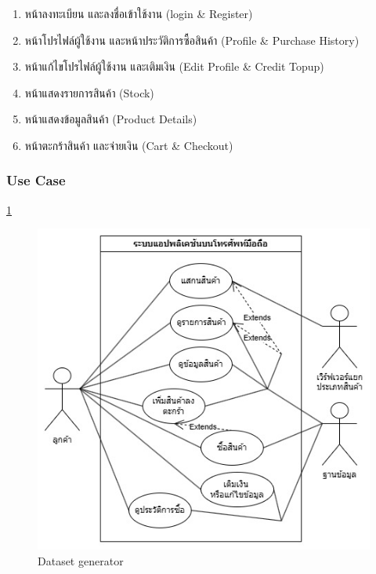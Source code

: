 \begin{enumerate}
  \item หน้าลงทะเบียน และลงชื่อเข้าใช้งาน (login \& Register)
  \item หน้าโปรไฟล์ผู้ใช้งาน และหน้าประวัติการซื้อสินค้า (Profile \& Purchase History)
  \item หน้าแก้ไขโปรไฟล์ผู้ใช้งาน และเติมเงิน (Edit Profile \& Credit Topup)
  \item หน้าแสดงรายการสินค้า (Stock)
  \item หน้าแสดงข้อมูลสินค้า (Product Details)
  \item หน้าตะกร้าสินค้า และจ่ายเงิน (Cart \& Checkout)

\end{enumerate}

\subsubsection{Use Case}
\newpage
\ref{fig:Mobile Application Use Case Diagram}

\begin{figure}[h]
  \begin{center}

    \includegraphics[scale=0.5]{pic/diagram/usecase-mobile.jpg}
  \end{center}

  \caption[Dataset generator]{Dataset generator}
  \label{fig:Mobile Application Use Case Diagram}
\end{figure}

